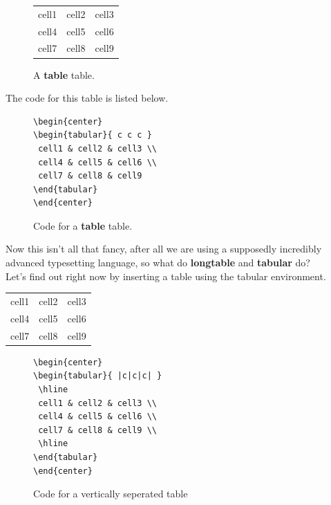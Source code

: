 \documentclass[12pt, letterpaper, oneside]{article} \usepackage[utf8]{inputenc}
\begin{document}
\begin{figure}[H]
\begin{center}
\begin{tabular}{ c c c }
 cell1 & cell2 & cell3 \\ 
 cell4 & cell5 & cell6 \\  
 cell7 & cell8 & cell9    
\end{tabular}
\end{center}
	\caption{A \textbf{table} table.}
\end{figure}

The code for this table is listed below.

\begin{figure}[H]
\begin{lstlisting}
\begin{center}
\begin{tabular}{ c c c }
 cell1 & cell2 & cell3 \\ 
 cell4 & cell5 & cell6 \\  
 cell7 & cell8 & cell9    
\end{tabular}
\end{center}
\end{lstlisting}
	\caption{Code for a \textbf{table} table.}
\end{figure}

Now this isn't all that fancy, after all we are using a supposedly incredibly advanced typesetting language, so what do \textbf{longtable} and \textbf{tabular} do?
\\
Let's find out right now by inserting a table using the tabular environment.

\begin{center}
\begin{tabular}{ |c|c|c| } 
 \hline
 cell1 & cell2 & cell3 \\ 
 cell4 & cell5 & cell6 \\ 
 cell7 & cell8 & cell9 \\ 
 \hline
\end{tabular}
\end{center}

\begin{figure}[H]
	\centering
	\begin{lstlisting}
\begin{center}
\begin{tabular}{ |c|c|c| } 
 \hline
 cell1 & cell2 & cell3 \\ 
 cell4 & cell5 & cell6 \\ 
 cell7 & cell8 & cell9 \\ 
 \hline
\end{tabular}
\end{center}
	\end{lstlisting}
	\caption{Code for a vertically seperated table}
\end{figure}
\end{document}
